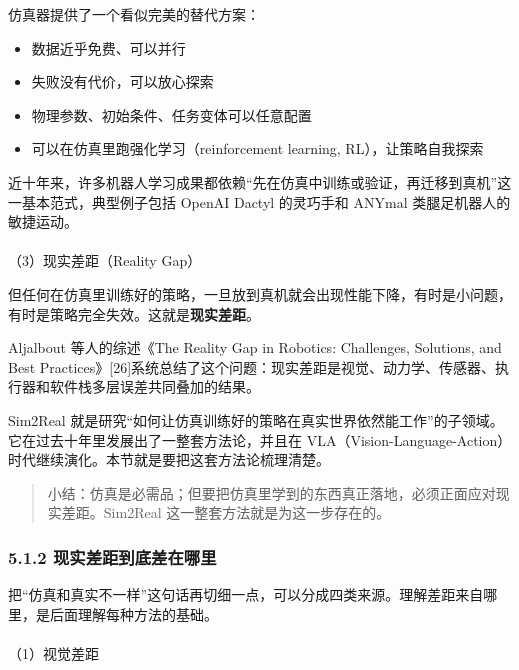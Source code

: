\documentclass[
  chinese,
]{ctexart}
\makeatletter
\let\oldparagraph\paragraph
\renewcommand{\paragraph}{
    \@ifstar
      \xxxParagraphStar
      \xxxParagraphNoStar
  }
\newcommand{\xxxParagraphStar}[1]{\oldparagraph*{#1}\mbox{}}
\newcommand{\xxxParagraphNoStar}[1]{\oldparagraph{#1}\mbox{}}
\providecommand{\tightlist}{%
  \setlength{\itemsep}{0pt}\setlength{\parskip}{0pt}}
\makeatother
\begin{document}
仿真器提供了一个看似完美的替代方案：

\begin{itemize}
\tightlist
\item
  数据近乎免费、可以并行
\item
  失败没有代价，可以放心探索
\item
  物理参数、初始条件、任务变体可以任意配置
\item
  可以在仿真里跑强化学习（reinforcement learning, RL），让策略自我探索
\end{itemize}

近十年来，许多机器人学习成果都依赖``先在仿真中训练或验证，再迁移到真机''这一基本范式，典型例子包括
OpenAI Dactyl 的灵巧手和 ANYmal 类腿足机器人的敏捷运动。

\paragraph{（3）现实差距（Reality
Gap）}\label{ux73b0ux5b9eux5deeux8dddreality-gap}

但任何在仿真里训练好的策略，一旦放到真机就会出现性能下降，有时是小问题，有时是策略完全失效。这就是\textbf{现实差距}。

Aljalbout 等人的综述《The Reality Gap in Robotics: Challenges,
Solutions, and Best
Practices》{[}26{]}系统总结了这个问题：现实差距是视觉、动力学、传感器、执行器和软件栈多层误差共同叠加的结果。

Sim2Real
就是研究``如何让仿真训练好的策略在真实世界依然能工作''的子领域。它在过去十年里发展出了一整套方法论，并且在
VLA（Vision-Language-Action）时代继续演化。本节就是要把这套方法论梳理清楚。

\begin{quote}
小结：仿真是必需品；但要把仿真里学到的东西真正落地，必须正面应对现实差距。Sim2Real
这一整套方法就是为这一步存在的。
\end{quote}

\subsubsection{5.1.2
现实差距到底差在哪里}\label{ux73b0ux5b9eux5deeux8dddux5230ux5e95ux5deeux5728ux54eaux91cc}

把``仿真和真实不一样''这句话再切细一点，可以分成四类来源。理解差距来自哪里，是后面理解每种方法的基础。

\paragraph{（1）视觉差距}\label{ux89c6ux89c9ux5deeux8ddd}
\end{document}
